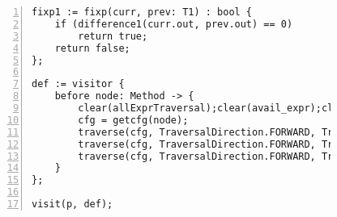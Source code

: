 \begin{figure}[ht!]
\begin{lstlisting}[numbers=left, tabsize=4, escapechar=@, caption={Available expression analysis},label={lst:ae-code},lastline=45]
fixp1 := fixp(curr, prev: T1) : bool {
	if (difference1(curr.out, prev.out) == 0)
		return true;	
	return false;
};

def := visitor {
	before node: Method -> {
		clear(allExprTraversal);clear(avail_expr);clear(killTraversal);clear(allExprset);
		cfg = getcfg(node);
		traverse(cfg, TraversalDirection.FORWARD, TraversalKind.HYBRID, allExprTraversal);
		traverse(cfg, TraversalDirection.FORWARD, TraversalKind.HYBRID, killTraversal);
		traverse(cfg, TraversalDirection.FORWARD, TraversalKind.HYBRID, avail_expr, fixp1);		
	}
};

visit(p, def);
\end{lstlisting}
\end{figure}